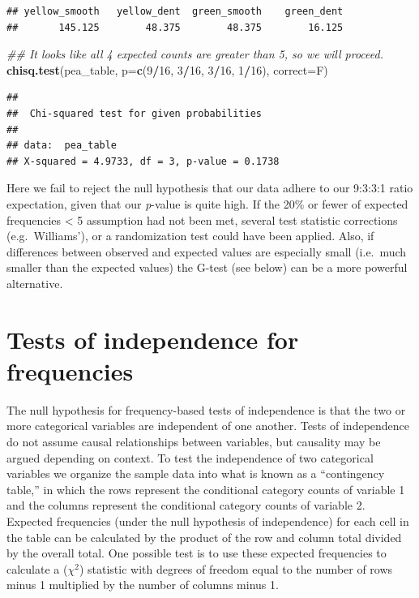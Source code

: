 \documentclass[]{book}
\newenvironment{Shaded}{\begin{snugshade}}{\end{snugshade}}
\newcommand{\CommentTok}[1]{\textcolor[rgb]{0.56,0.35,0.01}{\textit{#1}}}
\newcommand{\DataTypeTok}[1]{\textcolor[rgb]{0.13,0.29,0.53}{#1}}
\newcommand{\DecValTok}[1]{\textcolor[rgb]{0.00,0.00,0.81}{#1}}
\newcommand{\KeywordTok}[1]{\textcolor[rgb]{0.13,0.29,0.53}{\textbf{#1}}}
\newcommand{\NormalTok}[1]{#1}
\newcommand{\OperatorTok}[1]{\textcolor[rgb]{0.81,0.36,0.00}{\textbf{#1}}}
\begin{document}
\begin{verbatim}
## yellow_smooth   yellow_dent  green_smooth    green_dent 
##       145.125        48.375        48.375        16.125
\end{verbatim}

\begin{Shaded}
\begin{Highlighting}[]
\CommentTok{## It looks like all 4 expected counts are greater than 5, so we will proceed.}
\KeywordTok{chisq.test}\NormalTok{(pea_table, }\DataTypeTok{p=}\KeywordTok{c}\NormalTok{(}\DecValTok{9}\OperatorTok{/}\DecValTok{16}\NormalTok{, }\DecValTok{3}\OperatorTok{/}\DecValTok{16}\NormalTok{, }\DecValTok{3}\OperatorTok{/}\DecValTok{16}\NormalTok{, }\DecValTok{1}\OperatorTok{/}\DecValTok{16}\NormalTok{), }\DataTypeTok{correct=}\NormalTok{F)}
\end{Highlighting}
\end{Shaded}

\begin{verbatim}
## 
##  Chi-squared test for given probabilities
## 
## data:  pea_table
## X-squared = 4.9733, df = 3, p-value = 0.1738
\end{verbatim}

Here we fail to reject the null hypothesis that our data adhere to our 9:3:3:1 ratio expectation, given that our \emph{p}-value is quite high. If the 20\% or fewer of expected frequencies \textless{} 5 assumption had not been met, several test statistic corrections (e.g.~Williams'), or a randomization test could have been applied. Also, if differences between observed and expected values are especially small (i.e.~much smaller than the expected values) the G-test (see below) can be a more powerful alternative.

\hypertarget{tests-of-independence-for-frequencies}{%
\section{Tests of independence for frequencies}\label{tests-of-independence-for-frequencies}}

The null hypothesis for frequency-based tests of independence is that the two or more categorical variables are independent of one another. Tests of independence do not assume causal relationships between variables, but causality may be argued depending on context. To test the independence of two categorical variables we organize the sample data into what is known as a ``contingency table,'' in which the rows represent the conditional category counts of variable 1 and the columns represent the conditional category counts of variable 2. Expected frequencies (under the null hypothesis of independence) for each cell in the table can be calculated by the product of the row and column total divided by the overall total. One possible test is to use these expected frequencies to calculate a (\(\chi^2\)) statistic with degrees of freedom equal to the number of rows minus 1 multiplied by the number of columns minus 1.
\end{document}
